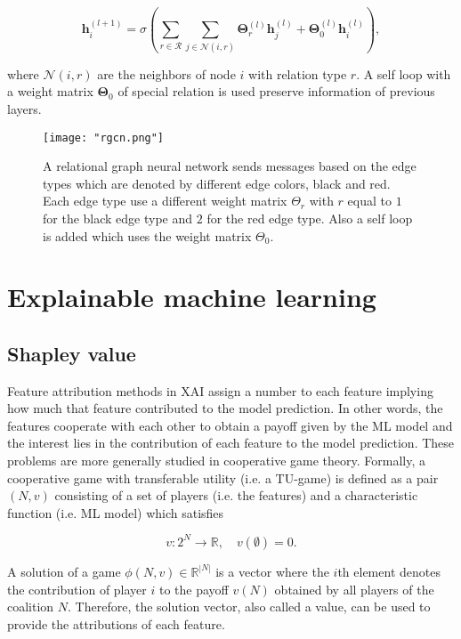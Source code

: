 \begin{equation}
	\pmb{h}^{(l+1)}_i = \sigma \left( \sum_{r \in \mathcal{R}} \sum_{j \in \mathcal{N}(i, r)} \pmb{\Theta}^{(l)}_r \pmb{h}^{(l)}_j
	+ \pmb{\Theta}^{(l)}_0 \pmb{h}^{(l)}_i \right),
\end{equation}


where $\mathcal{N}(i, r)$ are the neighbors of node $i$ with relation type $r$.
A self loop with a weight matrix $\pmb{\Theta}_0$ of special relation
is used preserve information of previous layers.

\begin{figure}[h]
    \centering 
    \texttt{[image: "rgcn.png"]}
    \caption{A relational graph neural network sends messages based on the edge 
    types which are denoted by different edge colors, black and red. Each edge 
    type use a different weight matrix $\Theta_r$ with $r$ equal to $1$ for the black 
    edge type and $2$ for the red edge type. Also a self loop is added which uses 
    the weight matrix $\Theta_0$.}
    \label{fig:rgcn}
\end{figure}


\section{Explainable machine learning}


\subsection{Shapley value}
\label{subsec:shapley_value}

Feature attribution methods in XAI assign a number to each feature implying how
much that feature contributed to the model prediction.\cite{merrick2020explanation}
In other words, the features cooperate with each other to obtain a payoff given
by the ML model and the interest lies in the contribution of each feature to the
model prediction. These problems are more generally studied in cooperative game
theory.\cite{branzei2008models} Formally, a cooperative game with transferable utility (i.e. a TU-game) is
defined as a pair $(N, v)$ consisting of a set of players (i.e. the features)
and a characteristic function (i.e. ML model) which satisfies\cite{zhang2022gstarx}


\begin{equation}
	v: 2^N \rightarrow \mathbb{R}, \quad v\left(\emptyset\right) = 0.
\end{equation}


A solution of a game $\phi(N, v) \in \mathbb{R}^{|N|}$ is a vector where the $i$th element
denotes the contribution of player $i$ to the payoff $v(N)$ obtained by all players
of the coalition $N$.\cite{zhang2022gstarx} Therefore, the solution vector,
also called a value, can be used to provide the attributions of each feature.


